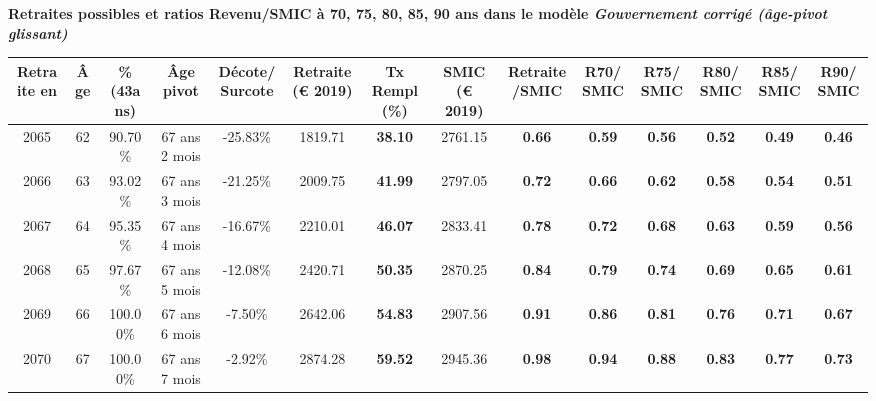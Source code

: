  \vspace{0.1cm} 
{\bf \noindent Retraites possibles et ratios Revenu/SMIC à 70, 75, 80, 85, 90 ans dans le modèle \emph{Gouvernement corrigé (âge-pivot glissant)}}  
 
\begin{adjustbox}{max width=\textwidth} 
\begin{tabular}[htb]{|c|c||c|c|c||c|c||c|c||c|c|c|c|c|} 
\hline 
 Retraite en &  Âge &  \%(43ans) &  Âge pivot &  Décote/Surcote &  Retraite (\euro{} 2019) &  Tx Rempl(\%) &  SMIC (\euro{} 2019) &  Retraite/SMIC &  R70/SMIC &  R75/SMIC &  R80/SMIC &  R85/SMIC &  R90/SMIC \\ 
\hline \hline 
 2065 &  62 &  90.70\% &  67 ans 2 mois &  -25.83\% &  1819.71 &  {\bf 38.10} &  2761.15 &  {\bf {\color{red} 0.66}} &  {\bf {\color{red} 0.59}} &  {\bf {\color{red} 0.56}} &  {\bf {\color{red} 0.52}} &  {\bf {\color{red} 0.49}} &  {\bf {\color{red} 0.46}} \\ 
\hline 
 2066 &  63 &  93.02\% &  67 ans 3 mois &  -21.25\% &  2009.75 &  {\bf 41.99} &  2797.05 &  {\bf {\color{red} 0.72}} &  {\bf {\color{red} 0.66}} &  {\bf {\color{red} 0.62}} &  {\bf {\color{red} 0.58}} &  {\bf {\color{red} 0.54}} &  {\bf {\color{red} 0.51}} \\ 
\hline 
 2067 &  64 &  95.35\% &  67 ans 4 mois &  -16.67\% &  2210.01 &  {\bf 46.07} &  2833.41 &  {\bf {\color{red} 0.78}} &  {\bf {\color{red} 0.72}} &  {\bf {\color{red} 0.68}} &  {\bf {\color{red} 0.63}} &  {\bf {\color{red} 0.59}} &  {\bf {\color{red} 0.56}} \\ 
\hline 
 2068 &  65 &  97.67\% &  67 ans 5 mois &  -12.08\% &  2420.71 &  {\bf 50.35} &  2870.25 &  {\bf {\color{red} 0.84}} &  {\bf {\color{red} 0.79}} &  {\bf {\color{red} 0.74}} &  {\bf {\color{red} 0.69}} &  {\bf {\color{red} 0.65}} &  {\bf {\color{red} 0.61}} \\ 
\hline 
 2069 &  66 &  100.00\% &  67 ans 6 mois &  -7.50\% &  2642.06 &  {\bf 54.83} &  2907.56 &  {\bf {\color{red} 0.91}} &  {\bf {\color{red} 0.86}} &  {\bf {\color{red} 0.81}} &  {\bf {\color{red} 0.76}} &  {\bf {\color{red} 0.71}} &  {\bf {\color{red} 0.67}} \\ 
\hline 
 2070 &  67 &  100.00\% &  67 ans 7 mois &  -2.92\% &  2874.28 &  {\bf 59.52} &  2945.36 &  {\bf {\color{red} 0.98}} &  {\bf {\color{red} 0.94}} &  {\bf {\color{red} 0.88}} &  {\bf {\color{red} 0.83}} &  {\bf {\color{red} 0.77}} &  {\bf {\color{red} 0.73}} \\ 
\hline 
\hline 
\end{tabular} 
\end{adjustbox} 
 
